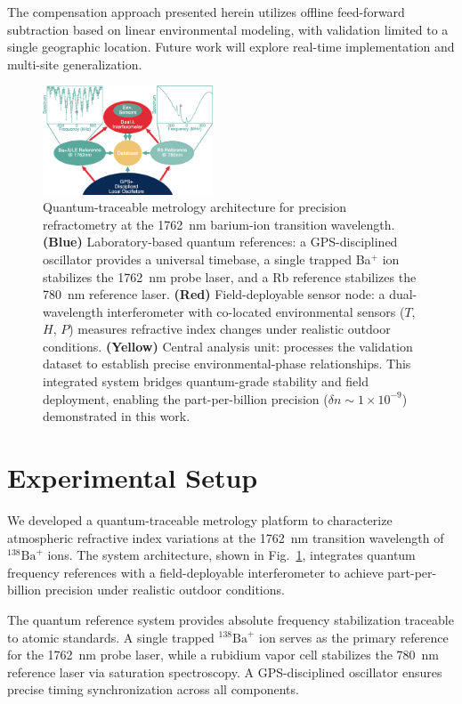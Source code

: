 \documentclass[aps,pra,reprint,groupedaddress,twocolumn,superscriptaddress]{revtex4-2}
\begin{document}
The compensation approach presented herein utilizes offline feed-forward subtraction based on linear environmental modeling, with validation limited to a single geographic location. Future work will explore real-time implementation and multi-site generalization.

\begin{figure}
\centering
\includegraphics[width=0.45\textwidth]{figures/fig1_nc.eps}
\caption{
Quantum-traceable metrology architecture for precision refractometry at the \SI{1762}{\nano\meter} barium-ion transition wavelength. 
\textbf{(Blue)} Laboratory-based quantum references: a GPS-disciplined oscillator provides a universal timebase, a single trapped Ba$^+$ ion stabilizes the \SI{1762}{\nano\meter} probe laser, and a Rb reference stabilizes the \SI{780}{\nano\meter} reference laser. 
\textbf{(Red)} Field-deployable sensor node: a dual-wavelength interferometer with co-located environmental sensors ($T$, $H$, $P$) measures refractive index changes under realistic outdoor conditions. 
\textbf{(Yellow)} Central analysis unit: processes the validation dataset to establish precise environmental-phase relationships. 
This integrated system bridges quantum-grade stability and field deployment, enabling the part-per-billion precision ($\delta n \sim 1 \times 10^{-9}$) demonstrated in this work.
}
\label{fig:exp_setup}
\end{figure}

\section{Experimental Setup}
\label{sec:experimental_setup}

We developed a quantum-traceable metrology platform to characterize atmospheric refractive index variations at the \SI{1762}{\nano\meter} transition wavelength of $^{138}\text{Ba}^+$ ions. The system architecture, shown in Fig.~\ref{fig:exp_setup}, integrates quantum frequency references with a field-deployable interferometer to achieve part-per-billion precision under realistic outdoor conditions.

The quantum reference system provides absolute frequency stabilization traceable to atomic standards. A single trapped $^{138}\text{Ba}^+$ ion serves as the primary reference for the \SI{1762}{\nano\meter} probe laser, while a rubidium vapor cell stabilizes the \SI{780}{\nano\meter} reference laser via saturation spectroscopy. A GPS-disciplined oscillator ensures precise timing synchronization across all components.
\end{document}
